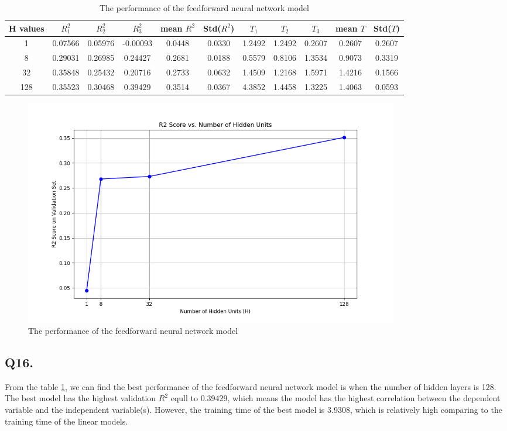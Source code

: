 \documentclass{article}
\begin{document}
\begin{table}[h!]
    \centering
    \small
    \begin{tabular}{|c|c|c|c|c|c|c|c|c|c|c|}
        \hline
        H values & $R^2_1$ & $R^2_2$ & $R^2_3$ & mean $R^2$ & Std($R^2$) & $T_1$ & $T_2$ & $T_3$ & mean $T$ & Std($T$) \\
        \hline
        1 & 0.07566 & 0.05976 &  -0.00093 & 0.0448 & 0.0330 & 1.2492 & 1.2492 & 0.2607  & 0.2607 & 0.2607\\
        8 & 0.29031 & 0.26985 & 0.24427 & 0.2681 & 0.0188 & 0.5579 & 0.8106 & 1.3534 & 0.9073 & 0.3319 \\
        32 & 0.35848 & 0.25432 & 0.20716 & 0.2733 & 0.0632 & 1.4509 & 1.2168 & 1.5971 & 1.4216 & 0.1566 \\
        128 & 0.35523 & 0.30468& 0.39429 & 0.3514 & 0.0367 & 4.3852 & 1.4458 & 1.3225 & 1.4063 & 0.0593 \\
        \hline
    \end{tabular}
    \caption{The performance of the feedforward neural network model}
    \label{tab:Feedforward}
\end{table}

\begin{figure}[h!]
    \centering
    \includegraphics[width=0.8\textwidth]{./pic/R2_Score_vs_Hidden_Units.png}
    \caption{The performance of the feedforward neural network model}
    \label{fig:feedforward}
\end{figure}


\subsection*{Q16.}

From the table \ref{tab:Feedforward}, we can find the best performance of the feedforward neural network model is when the number of hidden layers is 128.
The best model has the highest validation $R^2$ equll to 0.39429, which means the model has the highest correlation between the dependent variable and the independent variable(s).
However, the training time of the best model is 3.9308, which is relatively high comparing to the training time of the linear models.
\end{document}
